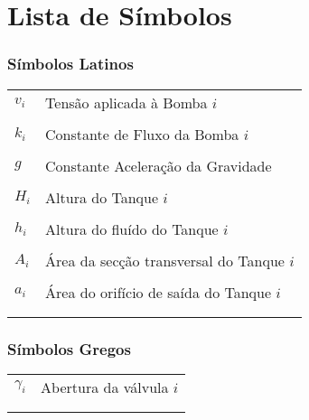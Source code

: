 %

\chapter*{Lista de Símbolos}

\subsection*{Símbolos Latinos}

\begin{tabular}{>{\centering}p{}l}
$v_i$ & Tensão aplicada à Bomba $i$ \\ \tabularnewline
$k_i$ & Constante de Fluxo da Bomba $i$ \\ \tabularnewline
$g$ & Constante Aceleração da Gravidade \\ \tabularnewline
$H_i$ & Altura do Tanque $i$\\ \tabularnewline
$h_i$ & Altura do fluído do Tanque $i$\\ \tabularnewline
$A_i$ & Área da secção transversal do Tanque $i$\\ \tabularnewline
$a_i$ & Área do orifício de saída do Tanque $i$\\ \tabularnewline
\tabularnewline
\end{tabular}

\subsection*{Símbolos Gregos}

\begin{tabular}{>{\centering}p{}l}
$\gamma_i$ & Abertura da válvula $i$\\ \tabularnewline
\tabularnewline
\end{tabular}%

